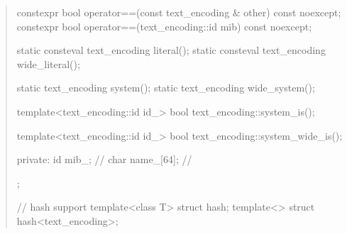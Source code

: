 \documentclass{wg21}
\begin{document}
\begin{quote}
\begin{addedblock}
\begin{codeblock}
{{    constexpr bool operator==(const text_encoding & other) const noexcept;
    constexpr bool operator==(text_encoding::id mib) const noexcept;

    static consteval text_encoding literal();
    static consteval text_encoding wide_literal();

    static text_encoding system();
    static text_encoding wide_system();
    
    
    template<text_encoding::id id_>
    bool text_encoding::system_is();
    
    template<text_encoding::id id_>
    bool text_encoding::system_wide_is();

    private:
        id mib_; // \expos
        char name_[64]; // \expos
    };


// hash support
template<class T> struct hash;
template<> struct hash<text_encoding>;

}


\end{codeblock}
\end{addedblock}
\end{quote}
\end{document}
